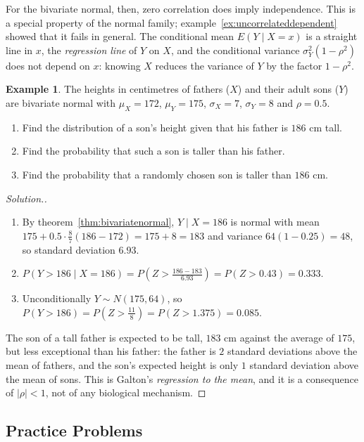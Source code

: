 \documentclass[12pt,a4paper]{report}
\theoremstyle{definition}
\newtheorem{example}[thm]{Example}
\theoremstyle{plain}
\theoremstyle{definition}
\newenvironment{solution}
  {\renewcommand{\qedsymbol}{}\begin{proof}[\textit{Solution}.]}
  {\end{proof}}
\begin{document}
For the bivariate normal, then, zero correlation does imply independence. This is a
special property of the normal family; example~\ref{ex:uncorrelateddependent} showed that it
fails in general. The conditional mean $E(Y\mid X = x)$ is a straight line in $x$, the
\emph{regression line} of $Y$ on $X$, and the conditional variance $\sigma_Y^2(1 - \rho^2)$ does
not depend on $x$: knowing $X$ reduces the variance of $Y$ by the factor $1 - \rho^2$.

\begin{example}
\label{ex:heights}
The heights in centimetres of fathers ($X$) and their adult sons ($Y$) are bivariate
normal with $\mu_X = 172$, $\mu_Y = 175$, $\sigma_X = 7$, $\sigma_Y = 8$ and $\rho = 0.5$.
\begin{enumerate}
\item[(a)] Find the distribution of a son's height given that his father is $186$ cm tall.
\item[(b)] Find the probability that such a son is taller than his father.
\item[(c)] Find the probability that a randomly chosen son is taller than $186$ cm.
\end{enumerate}
\end{example}

\begin{solution}
\begin{enumerate}
\item[(a)] By theorem~\ref{thm:bivariatenormal}, $Y\mid X = 186$ is normal with mean
$175 + 0.5\cdot\frac87(186 - 172) = 175 + 8 = 183$ and variance $64(1 - 0.25) = 48$, so
standard deviation $6.93$.
\item[(b)] $P(Y>186\mid X = 186) = P\left(Z>\frac{186 - 183}{6.93}\right) = P(Z>0.43) = 0.333$.
\item[(c)] Unconditionally $Y\sim N(175, 64)$, so $P(Y>186) = P\left(Z>\frac{11}{8}\right) = P(Z>1.375) = 0.085$.
\end{enumerate}
The son of a tall father is expected to be tall, $183$ cm against the average of $175$, but
less exceptional than his father: the father is $2$ standard deviations above the mean of
fathers, and the son's expected height is only $1$ standard deviation above the mean of
sons. This is Galton's \emph{regression to the mean}, and it is a consequence of
$|\rho|<1$, not of any biological mechanism.
\end{solution}

\subsection{Practice Problems}
\end{document}
